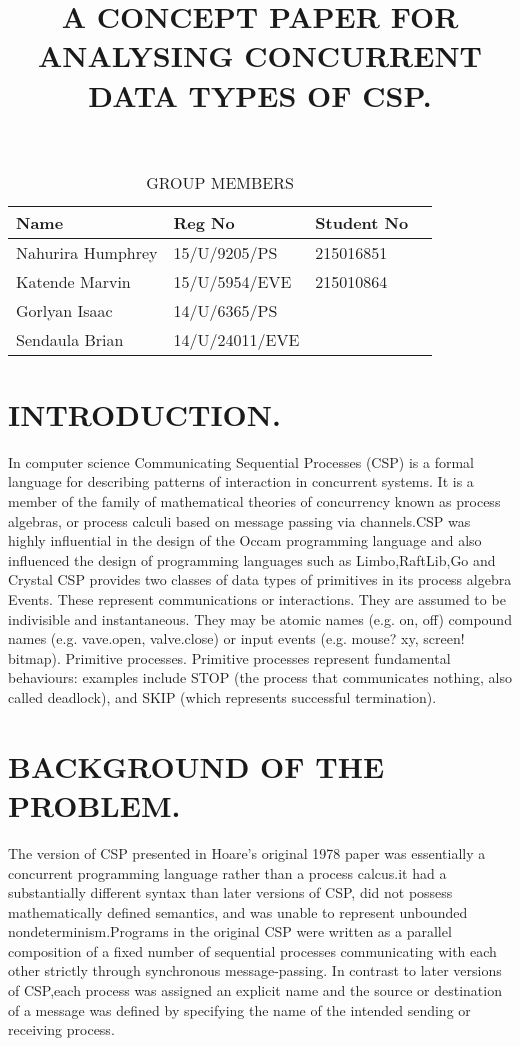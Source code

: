 \documentclass{article}
\begin{document}
\begin{table}[]
	\centering
	\caption{GROUP MEMBERS}
	\begin{tabular}{   |l | l | l|l    }
		\hline
		\bfseries {Name} & \bfseries {Reg No} & \bfseries {Student No} \\  \hline
		Nahurira  Humphrey& 15/U/9205/PS & 215016851	\\
		Katende Marvin& 15/U/5954/EVE &215010864 \\
		Gorlyan Isaac & 14/U/6365/PS &    \\
		Sendaula Brian&14/U/24011/EVE &	 \\

\hline
	
	\end{tabular}
\end{table}

\title {A CONCEPT PAPER FOR ANALYSING CONCURRENT DATA TYPES OF CSP.}
\maketitle

\section{INTRODUCTION.}
In computer science Communicating Sequential Processes (CSP) is a formal language for describing patterns of interaction in concurrent systems. It is a member of the family of mathematical theories of concurrency known as process algebras, or process calculi based on message passing via channels.CSP was highly influential in the design of the Occam programming language and also influenced the design of programming languages such as Limbo,RaftLib,Go and Crystal
CSP provides two classes of data types of primitives in its process algebra
Events. These represent communications or interactions. They are assumed to be indivisible and instantaneous. They may be atomic names (e.g. on, off) compound names (e.g. vave.open, valve.close) or input events (e.g. mouse? xy, screen! bitmap).
Primitive processes. Primitive processes represent fundamental behaviours: examples include STOP (the process that communicates nothing, also called deadlock), and SKIP (which represents successful termination).
\section{BACKGROUND OF THE PROBLEM.}
The version of CSP presented in Hoare’s original 1978 paper was essentially a concurrent programming language rather than a process calcus.it had a substantially different syntax than later versions of CSP, did not possess mathematically defined semantics, and was unable to represent unbounded nondeterminism.Programs in the original CSP were written as a parallel composition of a fixed number of sequential processes communicating with each other strictly through synchronous message-passing. In contrast to later versions of CSP,each process was assigned an explicit name and the source or destination of a message was defined by specifying the name of the intended sending or receiving process.
\end{document}
